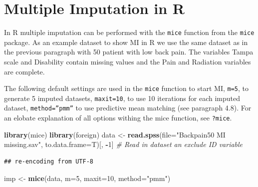 \documentclass[]{book}
\newenvironment{Shaded}{\begin{snugshade}}{\end{snugshade}}
\newcommand{\KeywordTok}[1]{\textcolor[rgb]{0.13,0.29,0.53}{\textbf{#1}}}
\newcommand{\DataTypeTok}[1]{\textcolor[rgb]{0.13,0.29,0.53}{#1}}
\newcommand{\DecValTok}[1]{\textcolor[rgb]{0.00,0.00,0.81}{#1}}
\newcommand{\StringTok}[1]{\textcolor[rgb]{0.31,0.60,0.02}{#1}}
\newcommand{\CommentTok}[1]{\textcolor[rgb]{0.56,0.35,0.01}{\textit{#1}}}
\newcommand{\OperatorTok}[1]{\textcolor[rgb]{0.81,0.36,0.00}{\textbf{#1}}}
\newcommand{\NormalTok}[1]{#1}
\begin{document}
\section{Multiple Imputation in R}\label{multiple-imputation-in-r}

In R multiple imputation can be performed with the \texttt{mice}
function from the \texttt{mice} package. As an example dataset to show
MI in R we use the same dataset as in the previous paragraph with 50
patient with low back pain. The variables Tampa scale and Disability
contain missing values and the Pain and Radiation variables are
complete.

The following default settings are used in the \texttt{mice} function to
start MI, \texttt{m=5}, to generate 5 imputed datasets,
\texttt{maxit=10}, to use 10 iterations for each imputed dataset,
\texttt{method=”pmm”} to use predictive mean matching (see paragraph
4.8). For an elobate explanation of all options withing the mice
function, see \texttt{?mice}.

\begin{Shaded}
\begin{Highlighting}[]
\KeywordTok{library}\NormalTok{(mice)}
\KeywordTok{library}\NormalTok{(foreign)}
\NormalTok{data <-}\StringTok{ }\KeywordTok{read.spss}\NormalTok{(}\DataTypeTok{file=}\StringTok{"Backpain50 MI missing.sav"}\NormalTok{, }\DataTypeTok{to.data.frame=}\NormalTok{T)[, }\OperatorTok{-}\DecValTok{1}\NormalTok{] }\CommentTok{# Read in dataset an exclude ID variable}
\end{Highlighting}
\end{Shaded}

\begin{verbatim}
## re-encoding from UTF-8
\end{verbatim}

\begin{Shaded}
\begin{Highlighting}[]
\NormalTok{imp <-}\StringTok{ }\KeywordTok{mice}\NormalTok{(data, }\DataTypeTok{m=}\DecValTok{5}\NormalTok{, }\DataTypeTok{maxit=}\DecValTok{10}\NormalTok{, }\DataTypeTok{method=}\StringTok{"pmm"}\NormalTok{)}
\end{Highlighting}
\end{Shaded}
\end{document}
